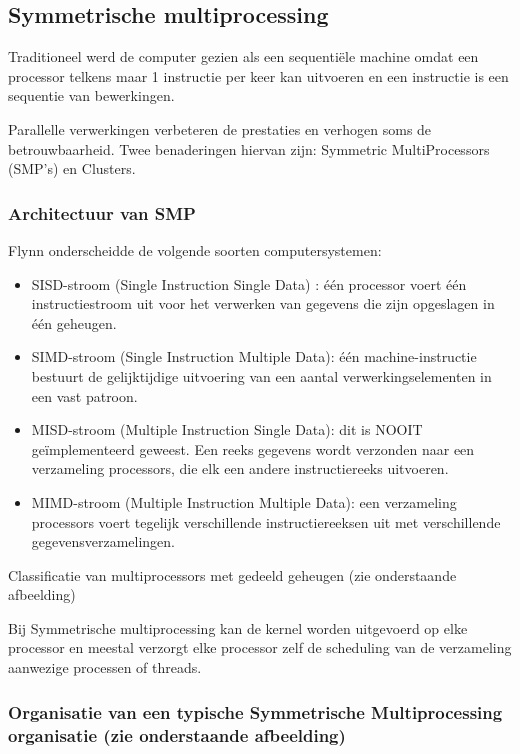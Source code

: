 \subsection{Symmetrische multiprocessing}

Traditioneel werd de computer gezien als een sequentiële machine omdat een processor telkens maar 1 instructie per keer kan uitvoeren en een instructie is een sequentie van bewerkingen.

Parallelle verwerkingen verbeteren de prestaties en verhogen soms de betrouwbaarheid. Twee benaderingen hiervan zijn: Symmetric MultiProcessors (SMP’s) en Clusters.


\subsubsection{Architectuur van SMP}

Flynn onderscheidde de volgende soorten computersystemen:

\begin{itemize}
\item SISD-stroom (Single Instruction Single Data) : één processor voert één instructiestroom uit voor het verwerken van gegevens die zijn opgeslagen in één geheugen.
\item SIMD-stroom (Single Instruction Multiple Data): één machine-instructie bestuurt de gelijktijdige uitvoering van een aantal verwerkingselementen in een vast patroon.
\item MISD-stroom (Multiple Instruction Single Data): dit is NOOIT geïmplementeerd geweest. Een reeks gegevens wordt verzonden naar een verzameling processors, die elk een andere instructiereeks uitvoeren.
\item MIMD-stroom (Multiple Instruction Multiple Data): een verzameling processors voert tegelijk verschillende instructiereeksen uit met verschillende gegevensverzamelingen.
\end{itemize}

Classificatie van multiprocessors met gedeeld geheugen (zie onderstaande afbeelding)


 
Bij Symmetrische multiprocessing kan de kernel worden uitgevoerd op elke processor en meestal verzorgt elke processor zelf de scheduling van de verzameling aanwezige processen of threads.


\subsubsection{Organisatie van een typische Symmetrische Multiprocessing organisatie (zie onderstaande afbeelding)}


